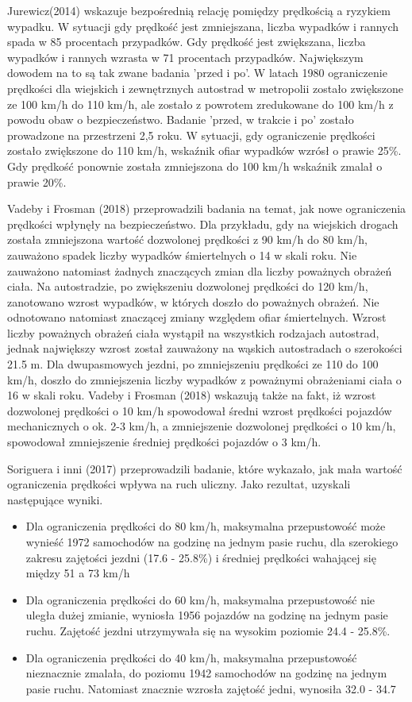 Jurewicz(2014) wskazuje bezpośrednią relację pomiędzy prędkością a ryzykiem wypadku. W sytuacji gdy prędkość jest zmniejszana,  liczba wypadków i rannych spada w 85 procentach przypadków. Gdy prędkość jest zwiększana, liczba wypadków i rannych wzrasta w 71 procentach przypadków. Największym dowodem na to są tak zwane badania 'przed i po'. W latach 1980 ograniczenie prędkości dla wiejskich i zewnętrznych autostrad w metropolii zostało zwiększone ze 100 km/h do 110 km/h, ale zostało  z powrotem zredukowane do 100 km/h z powodu obaw o bezpieczeństwo. Badanie 'przed, w trakcie i po' zostało prowadzone na przestrzeni 2,5 roku. W sytuacji, gdy ograniczenie prędkości zostało zwiększone do 110 km/h, wskaźnik ofiar wypadków wzrósł o prawie 25\%. Gdy prędkość ponownie została zmniejszona do 100 km/h wskaźnik zmalał o prawie 20\%.

Vadeby i Frosman (2018) przeprowadzili badania na temat, jak nowe ograniczenia prędkości wpłynęły na bezpieczeństwo. Dla przykładu, gdy na wiejskich drogach została zmniejszona wartość dozwolonej prędkości z 90 km/h do 80 km/h, zauważono spadek liczby wypadków śmiertelnych o 14 w skali roku. Nie zauważono natomiast żadnych znaczących zmian dla liczby poważnych obrażeń ciała. Na autostradzie, po zwiększeniu dozwolonej prędkości do 120 km/h, zanotowano wzrost wypadków, w których doszło do poważnych obrażeń. Nie odnotowano natomiast znaczącej zmiany względem ofiar śmiertelnych. Wzrost liczby poważnych obrażeń ciała wystąpił na wszystkich rodzajach autostrad, jednak największy wzrost został zauważony na wąskich autostradach o szerokości 21.5 m. Dla dwupasmowych jezdni, po zmniejszeniu prędkości ze 110 do 100 km/h, doszło do zmniejszenia liczby wypadków z poważnymi obrażeniami ciała o 16 w skali roku. Vadeby i Frosman (2018) wskazują także na fakt, iż wzrost dozwolonej prędkości o 10 km/h spowodował średni wzrost prędkości pojazdów mechanicznych o ok. 2-3 km/h, a zmniejszenie dozwolonej prędkości o 10 km/h, spowodował zmniejszenie średniej prędkości pojazdów o 3 km/h.

Soriguera i inni (2017) przeprowadzili badanie, które wykazało, jak mała wartość ograniczenia prędkości wpływa na ruch uliczny. Jako rezultat, uzyskali następujące wyniki.

\begin{itemize}
\item Dla ograniczenia prędkości do 80 km/h, maksymalna przepustowość może wynieść 1972 samochodów na godzinę na jednym pasie ruchu, dla szerokiego zakresu zajętości jezdni (17.6 - 25.8\%) i średniej prędkości wahającej się między 51 a 73 km/h
\item Dla ograniczenia prędkości do 60 km/h, maksymalna przepustowość nie uległa dużej zmianie, wyniosła 1956 pojazdów na godzinę na jednym pasie ruchu. Zajętość jezdni utrzymywała się na wysokim poziomie 24.4 - 25.8\%.
\item Dla ograniczenia prędkości do 40 km/h, maksymalna przepustowość nieznacznie zmalała, do poziomu 1942 samochodów na godzinę na jednym pasie ruchu. Natomiast znacznie wzrosła zajętość jedni, wynosiła 32.0 - 34.7%
\end{itemize}

